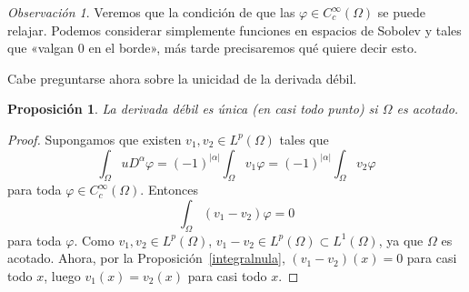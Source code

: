 \documentclass[12pt,a4paper]{book}
\newtheorem{prop}[thm]{Proposición}
\theoremstyle{definition} \newtheorem{defn}[thm]{Definición}
\theoremstyle{definition} \newtheorem{ejemplo}[thm]{Ejemplo}
\theoremstyle{definition} \newtheorem{ejercicio}[thm]{Ejercicio}
\theoremstyle{remark} \newtheorem*{obs}{Observación}
\begin{document}
  \begin{obs}
    Veremos que la condición de que las $\varphi\in C_c^{\infty}(\Omega)$ se puede relajar. Podemos considerar simplemente funciones en espacios de Sobolev y tales que «valgan 0 en el borde», más tarde precisaremos qué quiere decir esto.
  \end{obs}		
  Cabe preguntarse ahora sobre la unicidad de la derivada débil.
  \begin{prop}
    La derivada débil es única (en casi todo punto) si $\Omega$ es acotado.
  \end{prop}
  \begin{proof}
    Supongamos que existen $v_1,v_2 \in L^p(\Omega)$ tales que
    \begin{equation*}
      \int_\Omega u D^{\alpha} \varphi = (-1)^{|\alpha|}\int_\Omega v_1 \varphi=(-1)^{|\alpha|}\int_\Omega v_2 \varphi
    \end{equation*}
    para toda $\varphi \in C^{\infty}_c(\Omega)$. Entonces
    \begin{equation*}
      \int_\Omega (v_1-v_2) \varphi = 0
    \end{equation*}
    para toda $\varphi$. Como $v_1,v_2 \in L^p(\Omega)$, $v_1-v_2 \in L^p(\Omega)\subset L^1(\Omega)$, ya que $\Omega$ es acotado. Ahora, por la Proposición~\ref{integralnula}, $(v_1-v_2)(x)=0$ para casi todo $x$, luego $v_1(x)=v_2(x)$ para casi todo $x$.
  \end{proof}
\end{document}
